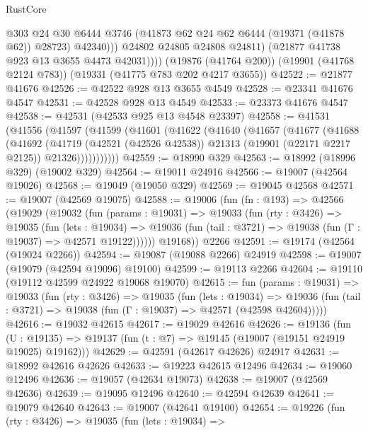 \begin{lexlean}{RustCore}
\begin{coremodule}
                  @303
                  @24
                  @30
                  @6444
                  @3746
                  (@41873 @62 @24 @62 @6444 (@19371 (@41878 @62)) @28723)
                  @42340)))
            @24802
            @24805
            @24808
            @24811)
          (@21877 @41738 @923 @13 @3655 @4473 @42031))))
    (@19876 (@41764 @200))
    (@19901 (@41768 @2124 @783))
    (@19331 (@41775 @783 @202 @4217 @3655))
@42522 := @21877 @41676
@42526 := @42522 @928 @13 @3655 @4549
@42528 := @23341 @41676 @4547
@42531 := @42528 @928 @13 @4549
@42533 := @23373 @41676 @4547
@42538 := @42531 (@42533 @925 @13 @4548 @23397)
@42558 := @41531
    (@41556
      (@41597
        (@41599
          (@41601
            (@41622
              (@41640
                (@41657
                  (@41677
                    (@41688
                      (@41692
                        (@41719
                          (@42521 (@42526 @42538))
                          @21313
                          (@19901 (@22171 @2217 @2125))
                          @21326)))))))))))
@42559 := @18990 @329
@42563 := @18992 (@18996 @329) (@19002 @329)
@42564 := @19011 @24916
@42566 := @19007 (@42564 @19026)
@42568 := @19049 (@19050 @329)
@42569 := @19045 @42568
@42571 := @19007 (@42569 @19075)
@42588 := @19006
    (fun (fn : @193) =>
    @42566
      (@19029
        (@19032
          (fun (params : @19031) =>
          @19033
            (fun (rty : @3426) =>
            @19035
              (fun (lets : @19034) =>
              @19036 (fun (tail : @3721) => @19038 (fun (Γ : @19037) => @42571 @19122))))))
        @19168))
    @2266
@42591 := @19174 (@42564 (@19024 @2266))
@42594 := @19087 (@19088 @2266) @24919
@42598 := @19007 (@19079 (@42594 @19096) @19100)
@42599 := @19113 @2266
@42604 := @19110 (@19112 @42599 @24922 @19068 @19070)
@42615 := fun (params : @19031) =>
  @19033
    (fun (rty : @3426) =>
    @19035
      (fun (lets : @19034) =>
      @19036 (fun (tail : @3721) => @19038 (fun (Γ : @19037) => @42571 (@42598 @42604)))))
@42616 := @19032 @42615
@42617 := @19029 @42616
@42626 := @19136
    (fun (U : @19135) => @19137 (fun (t : @7) => @19145 (@19007 (@19151 @24919 @19025) @19162)))
@42629 := @42591 (@42617 @42626) @24917
@42631 := @18992 @42616 @42626
@42633 := @19223 @42615 @12496
@42634 := @19060 @12496
@42636 := @19057 (@42634 @19073)
@42638 := @19007 (@42569 @42636)
@42639 := @19095 @12496
@42640 := @42594 @42639
@42641 := @19079 @42640
@42643 := @19007 (@42641 @19100)
@42654 := @19226
    (fun (rty : @3426) =>
    @19035
      (fun (lets : @19034) =>

\end{coremodule}
\end{lexlean}
